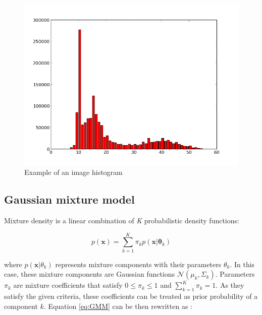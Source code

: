 \begin{figure}
	\begin{center}
		\includegraphics[scale=0.4]{Figures/segmentation/raw_histogram}
		\caption{Example of an image histogram}
		\label{img:Histogram}
	\end{center}
\end{figure}


\subsection{Gaussian mixture model} 

Mixture density is a linear combination of \textit{K} probabilistic density functions:

\begin{equation}
	p(\mathbf{x}) = \sum_{k=1}^{K}\pi_k p(\mathbf{x} | \boldsymbol \theta_k)
	\label{eq:GMM}
\end{equation}
	 
where $p(\mathbf{x} | \theta_k)$ represents mixture components with their parameters $\theta_k$. In this case, these mixture components are Gaussian functions $\mathcal{N}(\mu_k, \Sigma_k)$. Parameters $\pi_k$ are mixture coefficients that satisfy $0 \leq \pi_k \leq 1$ and $\sum_{k=1}^{K} \pi_k = 1$. As they satisfy the given criteria, these coefficients can be treated as prior probability of a component $k$. Equation \ref{eq:GMM} can be then rewritten as :

